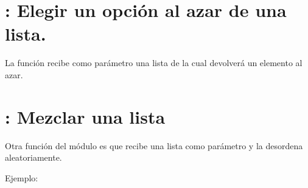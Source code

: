 \documentclass[a5paper,9pt,spanish]{sphinxmanual}
\begin{document}
\section{: Elegir un opción al azar de una lista.}
\label{\detokenize{random:choice-elegir-un-opcion-al-azar-de-una-lista}}
\sphinxAtStartPar
La función  recibe como parámetro una lista de la cual
devolverá un elemento al azar.

\begin{sphinxVerbatim}[commandchars=\\\{\}]
   

  \PYG{p}{[}  \PYG{p}{]}
  
\end{sphinxVerbatim}


\section{: Mezclar una lista}
\label{\detokenize{random:shuffle-mezclar-una-lista}}
\sphinxAtStartPar
Otra función del módulo  es  que recibe una lista
como parámetro y la desordena aleatoriamente.

\sphinxAtStartPar
Ejemplo:
\end{document}
